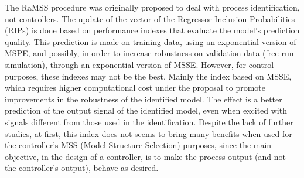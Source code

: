 The RaMSS procedure was originally proposed to deal with process identification, not controllers.
The update of the vector of the Regressor Inclusion Probabilities (RIPs) is done based on performance indexes that evaluate the model's prediction quality.
This prediction is made on training data, using an exponential version of MSPE, and possibly, in order to increase robustness on validation data (free run simulation), through an exponential version of MSSE.
However, for control purposes, these indexes may not be the best.
Mainly the index based on MSSE, which requires higher computational cost under the proposal to promote improvements in the robustness of the identified model. The effect is a better prediction of the output signal of the identified model, even when excited with signals different from those used in the identification.
Despite the lack of further studies, at first, this index does not seems to bring many benefits when used for the controller's MSS (Model Structure Selection) purposes, since the main objective, in the design of a controller, is to make the process output (and not the controller's output), behave as desired.

